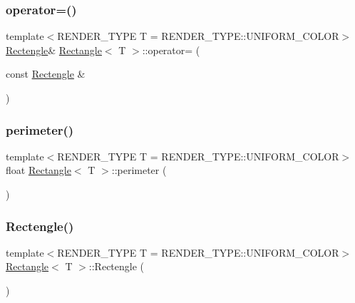 \mbox{\label{classRectangle_a5d30fb9cc735b658d47707cf954a3827}} 
\subsubsection{\texorpdfstring{operator=()}{operator=()}\hspace{0.1cm}{\footnotesize\ttfamily [2/2]}}
{\footnotesize\ttfamily template$<$R\+E\+N\+D\+E\+R\+\_\+\+T\+Y\+PE T = R\+E\+N\+D\+E\+R\+\_\+\+T\+Y\+P\+E\+::\+U\+N\+I\+F\+O\+R\+M\+\_\+\+C\+O\+L\+OR$>$ \\
\mbox{\hyperlink{classRectangle_ac286ca610cf35b12f3fd1636312cb1ce}{Rectengle}}\& \mbox{\hyperlink{classRectangle}{Rectangle}}$<$ T $>$\+::operator= (\begin{DoxyParamCaption}\item[{const \mbox{\hyperlink{classRectangle_ac286ca610cf35b12f3fd1636312cb1ce}{Rectengle}} \&}]{ }\end{DoxyParamCaption})\hspace{0.3cm}{\ttfamily [default]}}

\mbox{\label{classRectangle_a22d415e8360e3bf565745b8bf4625cc5}} 
\subsubsection{\texorpdfstring{perimeter()}{perimeter()}}
{\footnotesize\ttfamily template$<$R\+E\+N\+D\+E\+R\+\_\+\+T\+Y\+PE T = R\+E\+N\+D\+E\+R\+\_\+\+T\+Y\+P\+E\+::\+U\+N\+I\+F\+O\+R\+M\+\_\+\+C\+O\+L\+OR$>$ \\
float \mbox{\hyperlink{classRectangle}{Rectangle}}$<$ T $>$\+::perimeter (\begin{DoxyParamCaption}{ }\end{DoxyParamCaption})}

\mbox{\label{classRectangle_ac286ca610cf35b12f3fd1636312cb1ce}} 
\subsubsection{\texorpdfstring{Rectengle()}{Rectengle()}\hspace{0.1cm}{\footnotesize\ttfamily [1/3]}}
{\footnotesize\ttfamily template$<$R\+E\+N\+D\+E\+R\+\_\+\+T\+Y\+PE T = R\+E\+N\+D\+E\+R\+\_\+\+T\+Y\+P\+E\+::\+U\+N\+I\+F\+O\+R\+M\+\_\+\+C\+O\+L\+OR$>$ \\
\mbox{\hyperlink{classRectangle}{Rectangle}}$<$ T $>$\+::Rectengle (\begin{DoxyParamCaption}{ }\end{DoxyParamCaption})}

